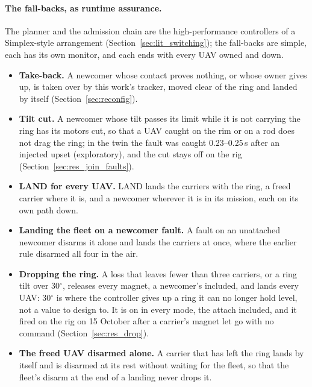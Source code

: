 \paragraph{The fall-backs, as runtime assurance.} The planner and the admission chain are the high-performance
controllers of a Simplex-style arrangement (Section~\ref{sec:lit_switching}); the fall-backs are simple, each has
its own monitor, and each ends with every UAV owned and down.
\begin{itemize}
    \item \textbf{Take-back.} A newcomer whose contact proves nothing, or whose owner gives up, is taken over by this
    work's tracker, moved clear of the ring and landed by itself (Section~\ref{sec:reconfig}).
    \item \textbf{Tilt cut.} A newcomer whose tilt passes its limit while it is not carrying the ring has its motors
    cut, so that a UAV caught on the rim or on a rod does not drag the ring; in the twin the fault was caught
    0.23--0.25\,s after an injected upset (exploratory), and the cut stays off on the rig
    (Section~\ref{sec:res_join_faults}).
    \item \textbf{LAND for every UAV.} LAND lands the carriers with the ring, a freed carrier where it is, and a
    newcomer wherever it is in its mission, each on its own path down.
    \item \textbf{Landing the fleet on a newcomer fault.} A fault on an unattached newcomer disarms it alone and
    lands the carriers at once, where the earlier rule disarmed all four in the air.
    \item \textbf{Dropping the ring.} A loss that leaves fewer than three carriers, or a ring tilt over 30$^\circ$,
    releases every magnet, a newcomer's included, and lands every UAV: 30$^\circ$ is where the controller gives up a
    ring it can no longer hold level, not a value to design to. It is on in every mode, the attach included, and it
    fired on the rig on 15 October after a carrier's magnet let go with no command (Section~\ref{sec:res_drop}).
    \item \textbf{The freed UAV disarmed alone.} A carrier that has left the ring lands by itself and is disarmed at
    its rest without waiting for the fleet, so that the fleet's disarm at the end of a landing never drops it.
\end{itemize}

